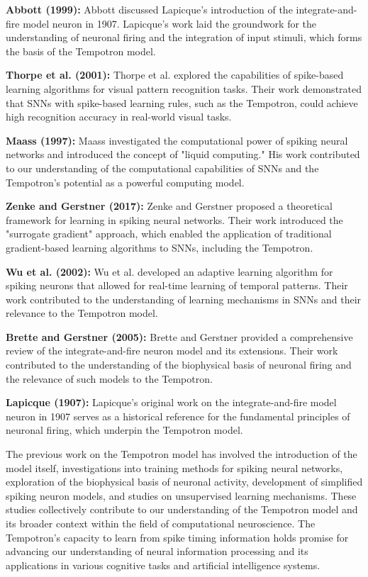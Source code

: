 \textbf{Abbott (1999):}
Abbott discussed Lapicque's introduction of the integrate-and-fire model neuron in 1907. Lapicque's work laid the groundwork for the understanding of neuronal firing and the integration of input stimuli, which forms the basis of the Tempotron model.

\textbf{Thorpe et al. (2001):}
Thorpe et al. explored the capabilities of spike-based learning algorithms for visual pattern recognition tasks. Their work demonstrated that SNNs with spike-based learning rules, such as the Tempotron, could achieve high recognition accuracy in real-world visual tasks.

\textbf{Maass (1997):}
Maass investigated the computational power of spiking neural networks and introduced the concept of "liquid computing." His work contributed to our understanding of the computational capabilities of SNNs and the Tempotron's potential as a powerful computing model.

\textbf{Zenke and Gerstner (2017):}
Zenke and Gerstner proposed a theoretical framework for learning in spiking neural networks. Their work introduced the "surrogate gradient" approach, which enabled the application of traditional gradient-based learning algorithms to SNNs, including the Tempotron.

\textbf{Wu et al. (2002):}
Wu et al. developed an adaptive learning algorithm for spiking neurons that allowed for real-time learning of temporal patterns. Their work contributed to the understanding of learning mechanisms in SNNs and their relevance to the Tempotron model.

\textbf{Brette and Gerstner (2005):}
Brette and Gerstner provided a comprehensive review of the integrate-and-fire neuron model and its extensions. Their work contributed to the understanding of the biophysical basis of neuronal firing and the relevance of such models to the Tempotron.

\textbf{Lapicque (1907):}
Lapicque's original work on the integrate-and-fire model neuron in 1907 serves as a historical reference for the fundamental principles of neuronal firing, which underpin the Tempotron model.

The previous work on the Tempotron model has involved the introduction of the model itself, investigations into training methods for spiking neural networks, exploration of the biophysical basis of neuronal activity, development of simplified spiking neuron models, and studies on unsupervised learning mechanisms. These studies collectively contribute to our understanding of the Tempotron model and its broader context within the field of computational neuroscience. The Tempotron's capacity to learn from spike timing information holds promise for advancing our understanding of neural information processing and its applications in various cognitive tasks and artificial intelligence systems.
